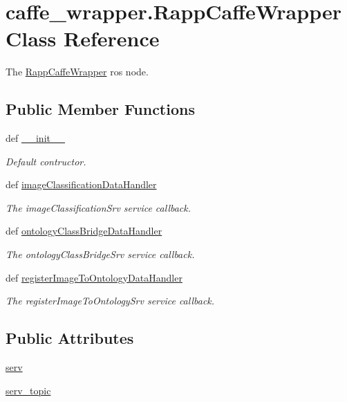 \hypertarget{classcaffe__wrapper_1_1RappCaffeWrapper}{\section{caffe\-\_\-wrapper.\-Rapp\-Caffe\-Wrapper Class Reference}
\label{classcaffe__wrapper_1_1RappCaffeWrapper}
}


The \hyperlink{classcaffe__wrapper_1_1RappCaffeWrapper}{Rapp\-Caffe\-Wrapper} ros node.  


\subsection*{Public Member Functions}
\begin{DoxyCompactItemize}
\item 
def \hyperlink{classcaffe__wrapper_1_1RappCaffeWrapper_af4cf1b45f28a24d6de623d95a11d30c8}{\-\_\-\-\_\-init\-\_\-\-\_\-}
\begin{DoxyCompactList}\small\item\em Default contructor. \end{DoxyCompactList}\item 
def \hyperlink{classcaffe__wrapper_1_1RappCaffeWrapper_ac1fe2519d0dbe6fb49399d154ba74c1d}{image\-Classification\-Data\-Handler}
\begin{DoxyCompactList}\small\item\em The image\-Classification\-Srv service callback. \end{DoxyCompactList}\item 
def \hyperlink{classcaffe__wrapper_1_1RappCaffeWrapper_a2a10c55c8220d4b225dd6fdea5e5bf6e}{ontology\-Class\-Bridge\-Data\-Handler}
\begin{DoxyCompactList}\small\item\em The ontology\-Class\-Bridge\-Srv service callback. \end{DoxyCompactList}\item 
def \hyperlink{classcaffe__wrapper_1_1RappCaffeWrapper_a507c7e61baae82d4c0596d724a6cf18d}{register\-Image\-To\-Ontology\-Data\-Handler}
\begin{DoxyCompactList}\small\item\em The register\-Image\-To\-Ontology\-Srv service callback. \end{DoxyCompactList}\end{DoxyCompactItemize}
\subsection*{Public Attributes}
\begin{DoxyCompactItemize}
\item 
\hyperlink{classcaffe__wrapper_1_1RappCaffeWrapper_aa639e886573f4b7ecdc4e06890547fc5}{serv}
\item 
\hyperlink{classcaffe__wrapper_1_1RappCaffeWrapper_ade290e890641a63e9a75abe540dff6d4}{serv\-\_\-topic}
\end{DoxyCompactItemize}


